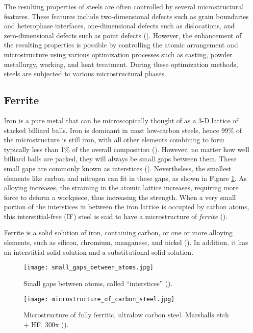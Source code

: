 The resulting properties of steels are often controlled by several microstructural features. These features include two-dimensional defects such as grain boundaries and heterophase interfaces, one-dimensional defects such as dislocations, and zero-dimensional defects such as point defects (\cite{clemens2017microstructure}). However, the enhancement of the resulting properties is possible by controlling the atomic arrangement and microstructure using various optimization processes such as casting, powder metallurgy, working, and heat treatment. During these optimization methods, steels are subjected to various microstructural phases.

\subsection{Ferrite} 
Iron is a pure metal that can be microscopically thought of as a 3-D lattice of stacked billiard balls. Iron is dominant in most low-carbon steels, hence 99\% of the microstructure is still iron, with all other elements combining to form typically less than 1\% of the overall composition (\cite{bajaj2020steels}). However, no matter how well billiard balls are packed, they will always be small gaps between them. These small gaps are commonly known as interstices (\cite{bajaj2020steels}). Nevertheless, the smallest elements like carbon and nitrogen can fit in these gaps, as shown in Figure \ref{ch3:figure:gaps}. As alloying increases, the straining in the atomic lattice increases, requiring more force to deform a workpiece, thus increasing the strength. When a very small portion of the interstices in between the iron lattice is occupied by carbon atoms, this interstitial-free (IF) steel is said to have a microstructure of \emph{ferrite} (\cite{bhadeshia2017steels}).

Ferrite is a solid solution of iron, containing carbon, or one or more alloying elements, such as silicon, chromium, manganese, and nickel (\cite{molabe2018determining}). In addition, it has an interstitial solid solution and a substitutional solid solution.
 
\begin{figure}[H]
    \centering
    \texttt{[image: small\_gaps\_between\_atoms.jpg]}
    \caption{Small gaps between atoms, called “interstices” (\cite{bajaj2020steels}).}
    \label{ch3:figure:gaps}
\end{figure}

\begin{figure}[H]
    \centering
    \texttt{[image: microstructure\_of\_carbon\_steel.jpg]}
    \caption{Microstructure of fully ferritic, ultralow carbon steel. Marshalls etch + HF, 300x (\cite{molabe2018determining}).}
    \label{ch3:figure:microstructure}
\end{figure}

